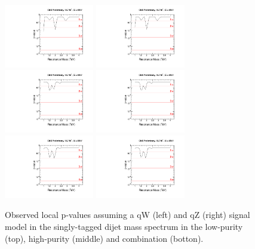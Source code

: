 \begin{figure}[h!tpb]
\begin{center}
\includegraphics[width=0.35\textwidth]{figs/limits/pvalue_qW_low_purity.pdf}
\includegraphics[width=0.35\textwidth]{figs/limits/pvalue_qZ_low_purity.pdf}\\
\includegraphics[width=0.35\textwidth]{figs/limits/pvalue_qW_high_purity.pdf}
\includegraphics[width=0.35\textwidth]{figs/limits/pvalue_qZ_high_purity.pdf}\\
\includegraphics[width=0.35\textwidth]{figs/limits/pvalue_qW_combined.pdf}
\includegraphics[width=0.35\textwidth]{figs/limits/pvalue_qZ_combined.pdf}
\end{center}
\caption{Observed local p-values assuming a qW (left) and qZ (right) signal model in the singly-tagged dijet mass spectrum in the low-purity (top), high-purity (middle) and combination (botton).}
\label{fig:Vtagresults4}
\end{figure}

